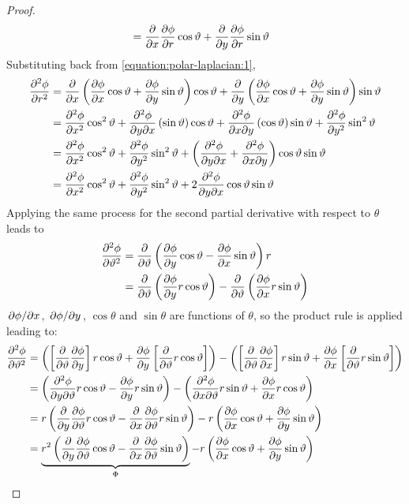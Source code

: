 \begin{lemma}
\begin{proof}
\begin{align*}
            &=\pdv{x}\pdv{\phi}{r}\cos\vartheta+\pdv{y}\pdv{\phi}{r}\sin\vartheta
        \end{align*}
        Substituting back from \eqref{equation:polar-laplacian:1},
        \begin{align*}
            \pdv[2]{\phi}{r}&=\pdv{x}\left(\pdv{\phi}{x}\cos\vartheta+\pdv{\phi}{y}\sin\vartheta\right)\cos\vartheta+\pdv{y}\left(\pdv{\phi}{x}\cos\vartheta+\pdv{\phi}{y}\sin\vartheta\right)\sin\vartheta\\
            &=\pdv[2]{\phi}{x}\cos^2\vartheta+\pdv{\phi}{y}{x}\left(\sin\vartheta\right)\cos\vartheta+\pdv{\phi}{x}{y}\left(\cos\vartheta\right)\sin\vartheta+\pdv[2]{\phi}{y}\sin^2\vartheta\\
            &=\pdv[2]{\phi}{x}\cos^2\vartheta+\pdv[2]{\phi}{y}\sin^2\vartheta+\left(\pdv{\phi}{y}{x}+\pdv{\phi}{x}{y}\right)\cos\vartheta\sin\vartheta\\
            &=\pdv[2]{\phi}{x}\cos^2\vartheta+\pdv[2]{\phi}{y}\sin^2\vartheta+2\pdv{\phi}{y}{x}\cos\vartheta\sin\vartheta
        \end{align*}
        Applying the same process for the second partial derivative with respect to $\theta$ leads to
        \begin{align*}
            \pdv[2]{\phi}{\vartheta}&=\pdv{\vartheta}\left(\pdv{\phi}{y}\cos\vartheta-\pdv{\phi}{x}\sin\vartheta\right)r\\
            &=\pdv{\vartheta}\left(\pdv{\phi}{y}r\cos\vartheta\right)-\pdv{\vartheta}\left(\pdv{\phi}{x}r\sin\vartheta\right)
        \end{align*}
        $\pdv*{\phi}{x}$, $\pdv*{\phi}{y}$, $\cos\theta$ and $\sin\theta$ are functions of $\theta$, so the product rule is applied leading to:
        \begin{align}
            \notag\pdv[2]{\phi}{\theta}&=\left(\left[\pdv{\theta}\pdv{\phi}{y}\right]r\cos\theta+\pdv{\phi}{y}\left[\pdv{\theta}r\cos\theta\right]\right)-\left(\left[\pdv{\theta}\pdv{\phi}{x}\right]r\sin\theta+\pdv{\phi}{x}\left[\pdv{\theta}r\sin\theta\right]\right)\\
            \notag&=\left(\pdv{\phi}{y}{\theta}r\cos\theta-\pdv{\phi}{y}r\sin\theta\right)-\left(\pdv{\phi}{x}{\theta}r\sin\theta+\pdv{\phi}{x}r\cos\theta\right)\\
            \notag&=r\left(\pdv{y}\pdv{\phi}{\theta}r\cos\theta-\pdv{x}\pdv{\phi}{\theta}r\sin\theta\right)-r\left(\pdv{\phi}{x}\cos\theta+\pdv{\phi}{y}\sin\theta\right)\\
            \label{equation:polar-laplacian:3}&=\underbrace{r^2\left(\pdv{y}\pdv{\phi}{\theta}\cos\theta-\pdv{x}\pdv{\phi}{\theta}\sin\theta\right)}_{\Phi}-r\left(\pdv{\phi}{x}\cos\theta+\pdv{\phi}{y}\sin\theta\right)

\end{align}
\end{proof}
\end{lemma}
